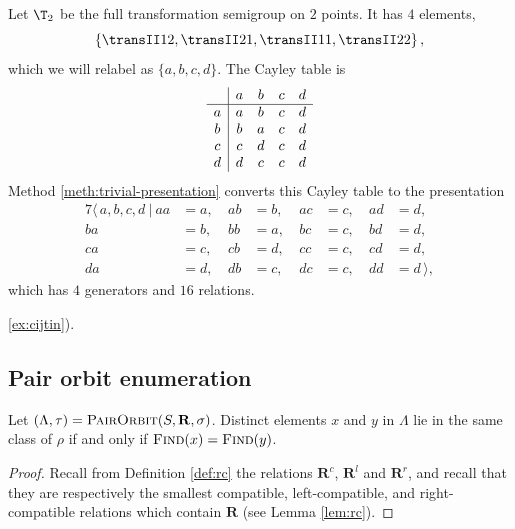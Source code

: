 \begin{example}
  Let $\T_2$ be the full transformation semigroup on $2$ points.  It has $4$
  elements,
  $$\left\{\transII 12, \transII 21, \transII 11, \transII 22\right\},$$
  which we will relabel as $\{a,b,c,d\}$.  The Cayley table is
  $$
  \begin{array}{c | c c c c}
    & a & b & c & d \\
    \hline
    a & a & b & c & d \\
    b & b & a & c & d \\
    c & c & d & c & d \\
    d & d & c & c & d \\
  \end{array}
  $$
  Method \ref{meth:trivial-presentation} converts this
  Cayley table to the presentation
  \begin{alignat*}{7}
    \langle\, a,b,c,d ~|~
    aa&=a,\ & ab&=b,\ & ac&=c,\ & ad&=d, \\
    ba&=b,\ & bb&=a,\ & bc&=c,\ & bd&=d, \\
    ca&=c,\ & cb&=d,\ & cc&=c,\ & cd&=d, \\
    da&=d,\ & db&=c,\ & dc&=c,\ & dd&=d\,\rangle,
  \end{alignat*}
  which has $4$ generators and $16$ relations.
\end{example}

 \ref{ex:cijtin}). 
 
 

\subsection{Pair orbit enumeration}
\label{sec:p}


\begin{theorem}
  \label{thm:p}
  Let $(\Lambda, \tau) = \textsc{PairOrbit}(S, \mathbf{R}, \sigma)$.  Distinct elements
  $x$ and $y$ in $\Lambda$ lie in the same class of $\rho$ if and only if
  $\textsc{Find}(x) = \textsc{Find}(y)$.
  \begin{proof}
    Recall from Definition \ref{def:rc} the relations $\mathbf{R}^c$,
    $\mathbf{R}^l$ and $\mathbf{R}^r$, and recall that they are respectively the
    smallest compatible, left-compatible, and right-compatible relations which
    contain $\mathbf{R}$ (see Lemma \ref{lem:rc}).
  \end{proof}
\end{theorem}


